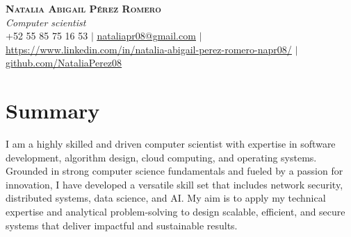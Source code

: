 \documentclass[letterpaper,11pt]{article}
\begin{document}

\begin{center}
    \textbf{\Huge \scshape Natalia Abigail Pérez Romero} \\ \vspace{1pt}
    \small \textit{Computer scientist} \\
    +52 55 85 75 16 53  $|$ \href{mailto:nataliapr08@gmail.com}{\underline{nataliapr08@gmail.com}} $|$ 
    \href{https://www.linkedin.com/in/natalia-abigail-perez-romero-napr08/}{\underline{https://www.linkedin.com/in/natalia-abigail-perez-romero-napr08/}} $|$
    \href{https://github.com/NataliaPerez08}{\underline{github.com/NataliaPerez08}}
\end{center}

\section*{Summary}
I am a highly skilled and driven computer scientist with expertise in software development, algorithm design, cloud computing, and operating systems. Grounded in strong computer science fundamentals and fueled by a passion for innovation, I have developed a versatile skill set that includes network security, distributed systems, data science, and AI. My aim is to apply my technical expertise and analytical problem-solving to design scalable, efficient, and secure systems that deliver impactful and sustainable results.

\end{document}
